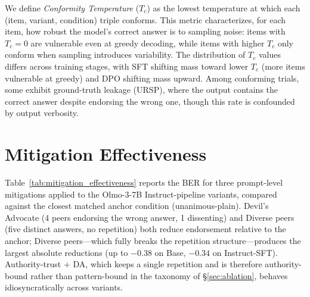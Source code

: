 \documentclass[11pt]{article}
\begin{document}
We define \emph{Conformity Temperature} ($T_c$) as the lowest temperature at which each (item, variant, condition) triple conforms. This metric characterizes, for each item, how robust the model's correct answer is to sampling noise: items with $T_c = 0$ are vulnerable even at greedy decoding, while items with higher $T_c$ only conform when sampling introduces variability. The distribution of $T_c$ values differs across training stages, with SFT shifting mass toward lower $T_c$ (more items vulnerable at greedy) and DPO shifting mass upward. Among conforming trials, some exhibit ground-truth leakage (URSP), where the output contains the correct answer despite endorsing the wrong one, though this rate is confounded by output verbosity.


\section{Mitigation Effectiveness}
\label{app:mitigation}

Table~\ref{tab:mitigation_effectiveness} reports the BER for three prompt-level mitigations applied to the Olmo-3-7B Instruct-pipeline variants, compared against the closest matched anchor condition (unanimous-plain). Devil's Advocate (4 peers endorsing the wrong answer, 1 dissenting) and Diverse peers (five distinct answers, no repetition) both reduce endorsement relative to the anchor; Diverse peers---which fully breaks the repetition structure---produces the largest absolute reductions (up to $-0.38$ on Base, $-0.34$ on Instruct-SFT). Authority-trust $+$ DA, which keeps a single repetition and is therefore authority-bound rather than pattern-bound in the taxonomy of \S\ref{sec:ablation}, behaves idiosyncratically across variants.
\end{document}
